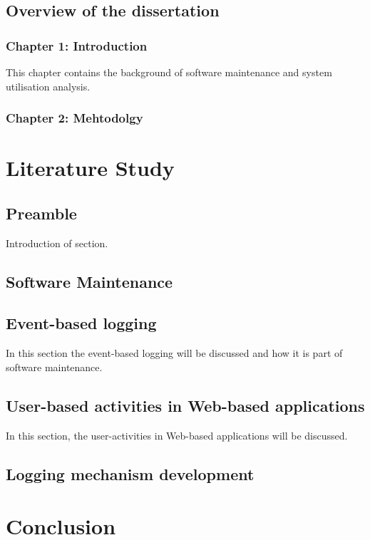 \subsection{Overview of the dissertation}
\subsubsection{Chapter 1: Introduction}
This chapter contains the background of software maintenance and system
utilisation analysis.
\subsubsection{Chapter 2: Mehtodolgy}

\newpage
\section{Literature Study}

\subsection{Preamble}
Introduction of section.

\subsection{Software Maintenance}


\subsection{Event-based logging}
In this section the event-based logging will be discussed and how it is part of software maintenance. 

\subsection{User-based activities in Web-based applications}
In this section, the user-activities in Web-based applications will be discussed.

\subsection{Logging mechanism development}

\section{Conclusion}


